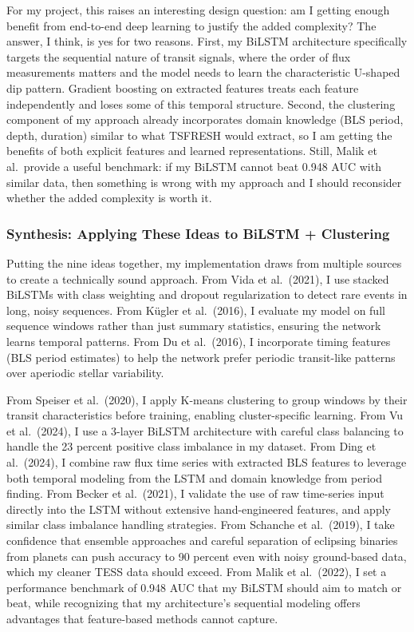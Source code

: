 \documentclass[letterpaper]{article} %
\begin{document}
For my project, this raises an interesting design question: am I getting enough benefit from end-to-end deep learning to justify the added complexity? The answer, I think, is yes for two reasons. First, my BiLSTM architecture specifically targets the sequential nature of transit signals, where the order of flux measurements matters and the model needs to learn the characteristic U-shaped dip pattern. Gradient boosting on extracted features treats each feature independently and loses some of this temporal structure. Second, the clustering component of my approach already incorporates domain knowledge (BLS period, depth, duration) similar to what TSFRESH would extract, so I am getting the benefits of both explicit features and learned representations. Still, Malik et al.\ provide a useful benchmark: if my BiLSTM cannot beat 0.948 AUC with similar data, then something is wrong with my approach and I should reconsider whether the added complexity is worth it.

\subsubsection{Synthesis: Applying These Ideas to BiLSTM + Clustering}

Putting the nine ideas together, my implementation draws from multiple sources to create a technically sound approach. From Vida et al.\ (2021), I use stacked BiLSTMs with class weighting and dropout regularization to detect rare events in long, noisy sequences. From Kügler et al.\ (2016), I evaluate my model on full sequence windows rather than just summary statistics, ensuring the network learns temporal patterns. From Du et al.\ (2016), I incorporate timing features (BLS period estimates) to help the network prefer periodic transit-like patterns over aperiodic stellar variability.

From Speiser et al.\ (2020), I apply K-means clustering to group windows by their transit characteristics before training, enabling cluster-specific learning. From Vu et al.\ (2024), I use a 3-layer BiLSTM architecture with careful class balancing to handle the 23 percent positive class imbalance in my dataset. From Ding et al.\ (2024), I combine raw flux time series with extracted BLS features to leverage both temporal modeling from the LSTM and domain knowledge from period finding. From Becker et al.\ (2021), I validate the use of raw time-series input directly into the LSTM without extensive hand-engineered features, and apply similar class imbalance handling strategies. From Schanche et al.\ (2019), I take confidence that ensemble approaches and careful separation of eclipsing binaries from planets can push accuracy to 90 percent even with noisy ground-based data, which my cleaner TESS data should exceed. From Malik et al.\ (2022), I set a performance benchmark of 0.948 AUC that my BiLSTM should aim to match or beat, while recognizing that my architecture's sequential modeling offers advantages that feature-based methods cannot capture.
\end{document}
